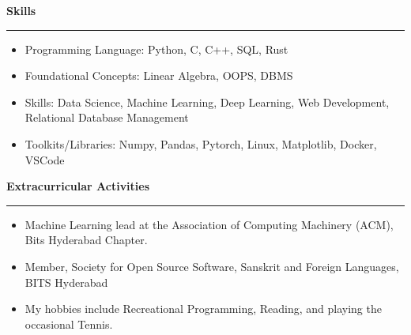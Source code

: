 \documentclass[a4paper,12pt]{report}
\begin{document}
 \par
\vspace{9pt}


\noindent 
\textbf{Skills} \par
\vspace{2pt}
\hrule
\vspace{6pt}
\noindent 
\begin{itemize}[noitemsep,topsep=0pt]
\item {\fontsize{12pt}{12pt}\selectfont Programming Language:}  Python, C, C++, SQL, Rust \par
\noindent 
\item {\fontsize{12pt}{12pt}\selectfont Foundational Concepts:} Linear Algebra, OOPS, DBMS \par
\noindent 
\item {\fontsize{12pt}{12pt}\selectfont Skills:} Data Science, Machine Learning, Deep Learning, Web Development, Relational Database Management \par
\noindent 
\item {\fontsize{12pt}{12pt}\selectfont Toolkits/Libraries:} Numpy, Pandas, Pytorch, Linux, Matplotlib, Docker, VSCode \par
\end{itemize}

\noindent
\textbf{Extracurricular Activities} \par
\vspace{2pt}
\hrule
\vspace{6pt}
\begin{itemize}[left=0pt, noitemsep, topsep=0pt]
    \item {\fontsize{12pt}{12pt} Machine Learning lead at the Association of Computing Machinery (ACM), Bits Hyderabad Chapter.}
    \item {\fontsize{12pt}{12pt}\selectfont Member, Society for Open Source Software, Sanskrit and Foreign Languages, BITS Hyderabad} \par
    \item {\fontsize{12pt}{12pt}\selectfont My hobbies include Recreational Programming, Reading, and playing the occasional Tennis.} \par
\end{itemize}
\end{document}
